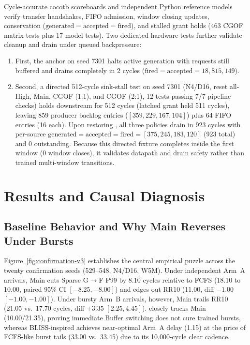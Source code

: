 Cycle-accurate cocotb scoreboards and independent Python reference models verify transfer handshakes, FIFO admission, window closing updates, conservation ($\text{generated}=\text{accepted}=\text{fired}$), and stalled grant holds (463 CGOF matrix tests plus 17 model tests). Two dedicated hardware tests further validate cleanup and drain under queued backpressure:
\begin{enumerate}
\item First, the  anchor on seed 7301 halts active generation with requests still buffered and drains completely in 2 cycles ($\text{fired}=\text{accepted}=18{,}815{,}149$).
\item Second, a directed 512-cycle sink-stall test on seed 7301 (N4/D16, reset all-High, Main, CGOF (1:1), and CGOF (2:1), 12 tests passing 7/7 pipeline checks) holds downstream  for 512 cycles (latched grant held 511 cycles), leaving 859 producer backlog entries ($[359,229,167,104]$) plus 64 FIFO entries (16 each). Upon restoring , all three policies drain in 923 cycles with per-source $\text{generated}=\text{accepted}=\text{fired}=[375,245,183,120]$ (923 total) and 0 outstanding. Because this directed fixture completes inside the first window (0 window closes), it validates datapath and drain safety rather than trained multi-window transitions.
\end{enumerate}

\section{Results and Causal Diagnosis}
\label{sec:results}

\subsection{Baseline Behavior and Why Main Reverses Under Bursts}
Figure~\ref{fig:confirmation-v3} establishes the central empirical puzzle across the twenty confirmation seeds (529--548, N4/D16, W5M). Under independent Arm~A arrivals, Main cuts Sparse G$\rightarrow$F P99 by 8.10 cycles relative to FCFS (18.10 to 10.00, paired 95\% CI $[-8.25, -8.00]$) and edges out RR10 (11.00, diff $-1.00$ $[-1.00, -1.00]$). Under bursty Arm~B arrivals, however, Main trails RR10 (21.05 vs.\ 17.70 cycles, diff $+3.35$ $[2.25, 4.45]$). \Alg{} closely tracks Main (10.00/21.35), proving immediate Buffer switching does not cure trained bursts, whereas BLISS-inspired achieves near-optimal Arm~A delay (1.15) at the price of FCFS-like burst tails (33.00 vs.\ 33.45) due to its 10,000-cycle clear cadence.

